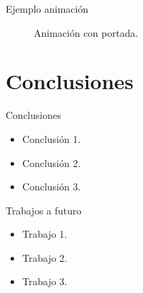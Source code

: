 \documentclass[
  aspectratio=169,
]{beamer}
\begin{document}
\begin{small}
\begin{frame}{Ejemplo animación}
	\begin{figure}[h!]
		\centering    
		\caption{Animación con portada.}
	\end{figure} 
\end{frame}
\section[Conclusiones]{Conclusiones}

\begin{frame}{Conclusiones }
	\begin{itemize}
		\item  Conclusión 1. 
		\pause 
		\item  Conclusión 2. 
		\pause
		\item  Conclusión 3. 
	\end{itemize}
\end{frame}
\begin{frame}{Trabajos a futuro }
	\begin{itemize}
		\item Trabajo 1.
		\pause
		\item Trabajo 2.
		\pause
		\item Trabajo 3.
	\end{itemize}
\end{frame}


\end{small}
\end{document}

